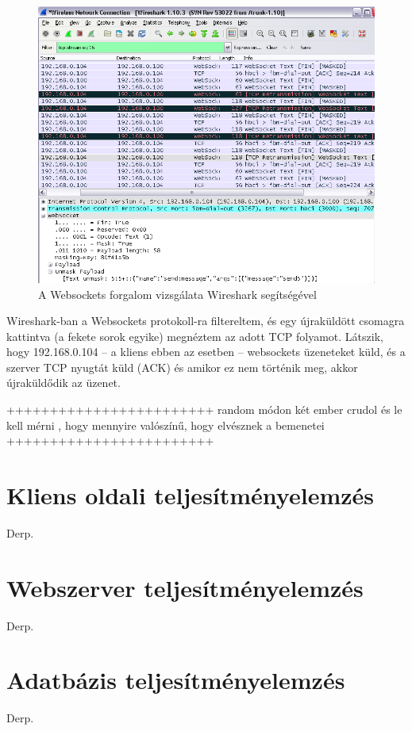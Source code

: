 \begin{figure}[!ht]
\centering
\includegraphics[width=15cm,keepaspectratio]{figures/wireshark.png}
\caption{A Websockets forgalom vizsgálata Wireshark segítségével}
\label{fig:wireshark}
\end{figure}


Wireshark-ban a Websockets protokoll-ra filtereltem, és egy újraküldött csomagra kattintva (a fekete sorok egyike) megnéztem az adott TCP folyamot. Látszik, hogy 192.168.0.104 -- a kliens ebben az esetben -- websockets üzeneteket küld, és a szerver TCP nyugtát küld (ACK) és amikor ez nem történik meg, akkor újraküldődik az üzenet.



++++++++++++++++++++++++
random módon két ember crudol és le kell mérni , hogy mennyire valószínű, hogy elvésznek a bemenetei
++++++++++++++++++++++++

\section{Kliens oldali teljesítményelemzés}
Derp.

\section{Webszerver teljesítményelemzés}
Derp.

\section{Adatbázis teljesítményelemzés}
Derp.





